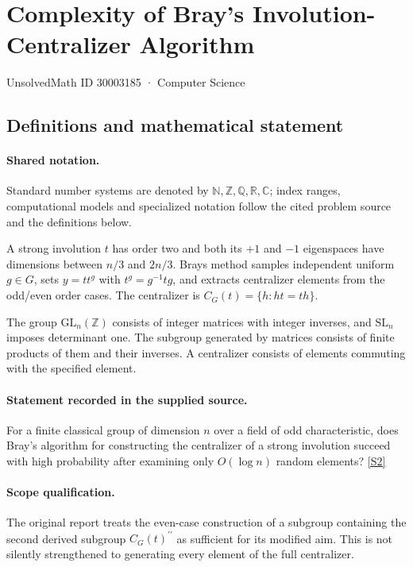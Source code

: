 \documentclass[11pt]{article}
\newcommand{\sref}[2]{\hyperlink{source:#1:#2}{[S#2]}}
\begin{document}
\setcounter{section}{30003184}
\section{Complexity of Bray’s Involution-Centralizer Algorithm}\label{30003185}
{\small\sffamily UnsolvedMath ID 30003185 · Computer Science}
\subsection{Definitions and mathematical statement}

\paragraph{Shared notation.}Standard number systems are denoted by $\mathbb N,\mathbb Z,\mathbb Q,\mathbb R,\mathbb C$; index ranges, computational models and specialized notation follow the cited problem source and the definitions below.


A strong involution $t$ has order two and both its $+1$ and $-1$ eigenspaces have dimensions between $n/3$ and $2n/3$. Bray\textquotesingle s method samples independent uniform $g\in G$, sets $y=tt^g$ with $t^g=g^{-1}tg$, and extracts centralizer elements from the odd/even order cases. The centralizer is $C_G(t)=\{h:ht=th\}$.

The group $\mathrm{GL}_n(\mathbb Z)$ consists of integer matrices with integer inverses, and $\mathrm{SL}_n$ imposes determinant one. The subgroup generated by matrices consists of finite products of them and their inverses. A centralizer consists of elements commuting with the specified element.
\paragraph{Statement recorded in the supplied source.}
For a finite classical group of dimension $n$ over a field of odd characteristic, does Bray's algorithm for constructing the centralizer of a strong involution succeed with high probability after examining only $O(\log n)$ random elements? \sref{30003185}{2}
\paragraph{Scope qualification.}
The original report treats the even-case construction of a subgroup containing the second derived subgroup $C_G(t)^{\prime\prime}$ as sufficient for its modified aim. This is not silently strengthened to generating every element of the full centralizer.
\end{document}
